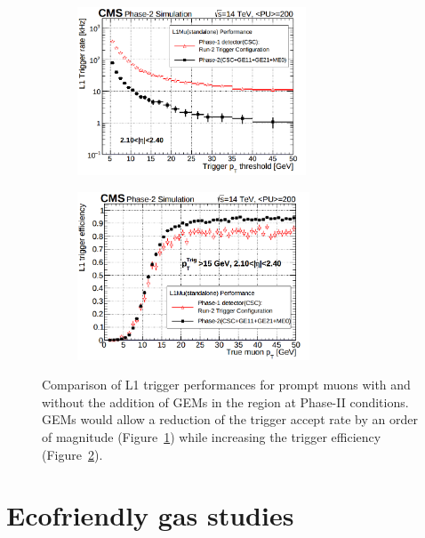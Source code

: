 	\begin{figure}[H]
		\begin{subfigure}{0.5\linewidth}
			\centering
			\includegraphics[height=5cm]{fig/chapt3/GEM-trigger-rate.png}
			\caption{\label{fig:CSC-GEM-perf:A}}
		\end{subfigure}
		\begin{subfigure}{0.5\linewidth}
			\centering
			\includegraphics[height=5cm]{fig/chapt3/GEM-trigger-eff.png}
			\caption{\label{fig:CSC-GEM-perf:B}}
		\end{subfigure}
		\caption{\label{fig:CSC-GEM-perf} Comparison of L1 trigger performances for prompt muons with and without the addition of GEMs in the region  at Phase-II conditions. GEMs would allow a reduction of the trigger accept rate by an order of magnitude (Figure~\ref{fig:CSC-GEM-perf:A}) while increasing the trigger efficiency (Figure~\ref{fig:CSC-GEM-perf:B}).}
	\end{figure}

\section{Ecofriendly gas studies}
\label{chapt3:sec:EcoGas}

